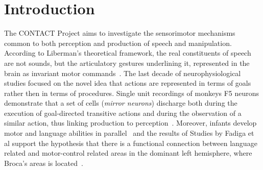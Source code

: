 \section{Introduction}
\label{ch:intro}
The CONTACT Project aims to investigate the
sensorimotor mechanisms common to both perception and production of speech and
manipulation.
%
According to Liberman's theoretical framework,
the real constituents of speech are not sounds, but the articulatory
gestures underlining it, represented in the brain as invariant motor 
commands~\citep{liberman.mattingly:1985}.
The last decade of neurophysiological studies focused on the novel idea that
actions are represented in terms of goals rather then in terms of
procedures. 
Single unit recordings of monkeys F5 neurons demonstrate that a set of cells
(\emph{mirror neurons}) discharge both during the execution of goal-directed 
transitive  actions and during the observation of a similar action, thus 
linking production to perception~\citep{rizzolatti.etal:1988,rizzolatti.etal:1996,rizzolatti.fadiga:1998}. 
Moreover, infants develop motor and language abilities in
parallel~\citep{lennenberg:1967,kandel.schwartz.jessel:2000} and the results of
Studies by Fadiga et al support
%
%
the hypothesis that there is a functional connection between language related
and motor-control related areas in the dominant left
hemisphere, where Broca's areas is located~\citep{fadiga.etal:PRESS}. 


